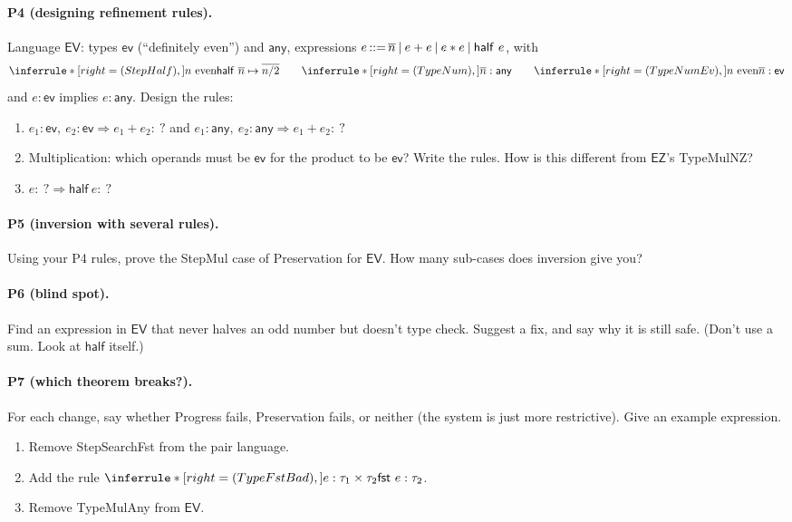 \documentclass[11pt]{article}
\newcommand{\stepto}[2]{#1 \mapsto #2}
\newcommand{\FST}[1]{\mathsf{fst}\ #1}
\newcommand{\ANY}{\mathsf{any}}
\newcommand{\num}[1]{\overline{#1}}
\newcommand{\HALF}[1]{\mathsf{half}\ #1}
\newcommand{\EV}{\mathsf{ev}}
\begin{document}
\paragraph{P4 (designing refinement rules).} Language $\mathsf{EV}$: types
$\EV$ (``definitely even'') and $\ANY$, expressions
$e \bnfdef \num n \bnfalt e+e \bnfalt e*e \bnfalt \HALF{e}$, with
\[
  \Rule{StepHalf}{\text{$n$ even}}{\stepto{\HALF{\num n}}{\num{n/2}}}
  \qquad
  \Rule{TypeNum}{\strut}{\num n:\ANY}
  \qquad
  \Rule{TypeNumEv}{\text{$n$ even}}{\num n:\EV}
\]
and $e:\EV$ implies $e:\ANY$. Design the rules:
\begin{enumerate}
  \item $e_1:\EV,\ e_2:\EV \Rightarrow e_1+e_2:\ ?$ \quad and \quad
        $e_1:\ANY,\ e_2:\ANY \Rightarrow e_1+e_2:\ ?$
  \item Multiplication: which operands must be $\EV$ for the product to be
        $\EV$? Write the rules. How is this different from $\mathsf{EZ}$'s
        TypeMulNZ?
  \item $e:\ ? \Rightarrow \HALF{e}:\ ?$
\end{enumerate}

\paragraph{P5 (inversion with several rules).} Using your P4 rules, prove
the StepMul case of Preservation for $\mathsf{EV}$. How many sub-cases does
inversion give you?

\paragraph{P6 (blind spot).} Find an expression in $\mathsf{EV}$ that never
halves an odd number but doesn't type check. Suggest a fix, and say why it
is still safe. (Don't use a sum. Look at $\mathsf{half}$ itself.)

\paragraph{P7 (which theorem breaks?).} For each change, say whether
Progress fails, Preservation fails, or neither (the system is just more
restrictive). Give an example expression.
\begin{enumerate}
  \item Remove StepSearchFst from the pair language.
  \item Add the rule
        $\Rule{TypeFstBad}{e:\tau_1\times\tau_2}{\FST{e}:\tau_2}$.
  \item Remove TypeMulAny from $\mathsf{EV}$.
\end{enumerate}
\end{document}
